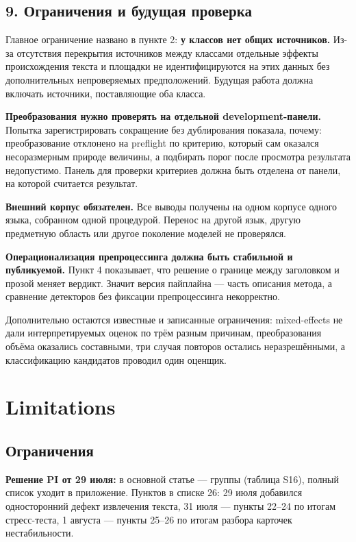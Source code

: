 \documentclass[11pt,a4paper]{article}
\renewcommand{\_}{\textunderscore\allowbreak}
\begin{document}
\subsection{9. Ограничения и будущая проверка}

Главное ограничение названо в пункте 2: \textbf{у классов нет общих источников.} Из-за
отсутствия перекрытия источников между классами отдельные эффекты происхождения
текста и площадки не идентифицируются на этих данных без дополнительных
непроверяемых предположений. Будущая работа должна включать источники,
поставляющие оба класса.

\textbf{Преобразования нужно проверять на отдельной development-панели.} Попытка
зарегистрировать сокращение без дублирования показала, почему: преобразование
отклонено на preflight по критерию, который сам оказался несоразмерным природе
величины, а подбирать порог после просмотра результата недопустимо. Панель для
проверки критериев должна быть отделена от панели, на которой считается результат.

\textbf{Внешний корпус обязателен.} Все выводы получены на одном корпусе одного языка,
собранном одной процедурой. Перенос на другой язык, другую предметную область или
другое поколение моделей не проверялся.

\textbf{Операционализация препроцессинга должна быть стабильной и публикуемой.} Пункт 4
показывает, что решение о границе между заголовком и прозой меняет вердикт.
Значит версия пайплайна — часть описания метода, а сравнение детекторов без
фиксации препроцессинга некорректно.

Дополнительно остаются известные и записанные ограничения: mixed-effects не дали
интерпретируемых оценок по трём разным причинам, преобразования объёма оказались
составными, три случая повторов остались неразрешёнными, а классификацию
кандидатов проводил один оценщик.

\section{Limitations}

\subsection{Ограничения}

\textbf{Решение PI от 29 июля:} в основной статье — группы (таблица S16), полный список уходит в приложение. Пунктов в списке 26: 29 июля добавился односторонний дефект извлечения текста, 31 июля — пункты 22–24 по итогам стресс-теста, 1 августа — пункты 25–26 по итогам разбора карточек нестабильности.
\end{document}
